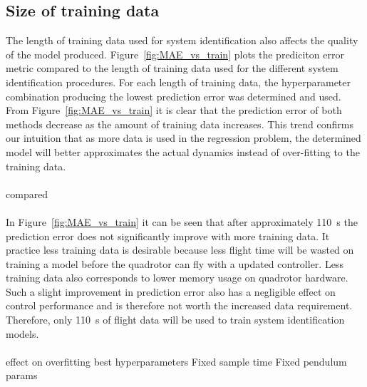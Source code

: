     \subsection{Size of training data}
        The length of training data used for system identification also affects the quality of the model produced.
        Figure~\ref{fig:MAE_vs_train} plots the prediciton error metric compared to the length of training data used for the different system identification procedures.
        For each length of training data, the hyperparameter combination producing the lowest prediction error was determined and used.
        From Figure~\ref{fig:MAE_vs_train} it is clear that the prediction error of both methods decrease as the amount of training data increases.
        This trend confirms our intuition that as more data is used in the regression problem, 
        the determined model will better approximates the actual dynamics instead of over-fitting to the training data.
        
        

        \paragraph{}
        compared

        \paragraph{}
        In Figure~\ref{fig:MAE_vs_train} it can be seen that after approximately \SI{110}{\second} 
        the prediction error does not significantly improve with more training data.
        It practice less training data is desirable because less flight time will be wasted on training a model before the quadrotor can fly with a updated controller.
        Less training data also corresponds to lower memory usage on quadrotor hardware.
        Such a slight improvement in prediction error also has a negligible effect on control performance and is therefore not worth the increased data requirement.
        Therefore, only \SI{110}{\second} of flight data will be used to train system identification models. 
        
        \paragraph{}

        effect on overfitting
        best hyperparameters
        Fixed sample time
        Fixed pendulum params
    
